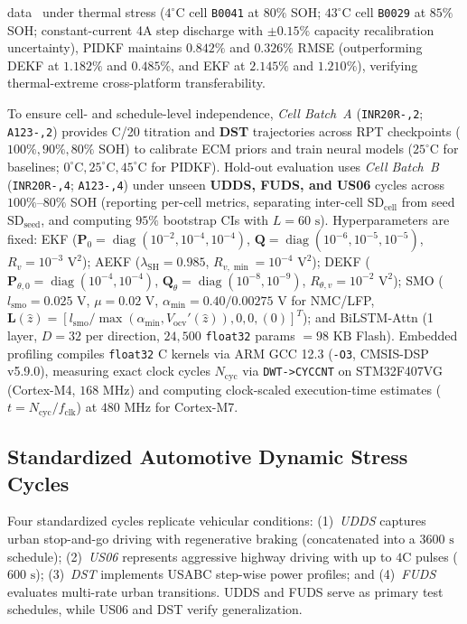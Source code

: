 \documentclass[balance,nocopyright,upint,varvw,hyphenate,barcolor=NavyBlue,nolists]{asmejour}
\begin{document}
data~\cite{Saha2007nasa} under thermal stress ($4^\circ\text{C}$ cell \texttt{B0041} at $80\%$ SOH; $43^\circ\text{C}$ cell \texttt{B0029} at $85\%$ SOH; constant-current 4A step discharge with $\pm 0.15\%$ capacity recalibration uncertainty), PIDKF maintains $0.842\%$ and $0.326\%$ RMSE (outperforming DEKF at $1.182\%$ and $0.485\%$, and EKF at $2.145\%$ and $1.210\%$), verifying thermal-extreme cross-platform transferability.

To ensure cell- and schedule-level independence, \emph{Cell Batch~A} (\texttt{INR20R-,2}; \texttt{A123-,2}) provides C/20 titration and \textbf{DST} trajectories across RPT checkpoints ($100\%, \allowbreak 90\%, \allowbreak 80\%$ SOH) to calibrate ECM priors and train neural models ($25^\circ\text{C}$ for baselines; $0^\circ\text{C}, \allowbreak 25^\circ\text{C}, \allowbreak 45^\circ\text{C}$ for PIDKF). Hold-out evaluation uses \emph{Cell Batch~B} (\texttt{INR20R-,4}; \texttt{A123-,4}) under unseen \textbf{UDDS, FUDS, and US06} cycles across $100\%\text{--}80\%$ SOH (reporting per-cell metrics, separating inter-cell $\text{SD}_{\text{cell}}$ from seed $\text{SD}_{\text{seed}}$, and computing $95\%$ bootstrap CIs with $L=60\text{ s}$). Hyperparameters are fixed: EKF ($\mathbf{P}_0 = \allowbreak\operatorname{diag}(10^{-2}, \allowbreak 10^{-4}, \allowbreak 10^{-4})$, $\mathbf{Q} = \allowbreak\operatorname{diag}(10^{-6}, \allowbreak 10^{-5}, \allowbreak 10^{-5})$, $R_v = \allowbreak 10^{-3}\text{ V}^2$); AEKF ($\lambda_{\text{SH}} = 0.985$, $R_{v,\min} = \allowbreak 10^{-4}\text{ V}^2$); DEKF ($\mathbf{P}_{\theta,0} = \allowbreak\operatorname{diag}(10^{-4}, \allowbreak 10^{-4})$, $\mathbf{Q}_\theta = \allowbreak\operatorname{diag}(10^{-8}, \allowbreak 10^{-9})$, $R_{\theta,v} = \allowbreak 10^{-2}\text{ V}^2$); SMO ($l_{\text{smo}} = 0.025\text{ V}$, $\mu = 0.02\text{ V}$, $\alpha_{\min} = 0.40/0.00275\text{ V}$ for NMC/LFP, $\mathbf{L}(\hat{z}) = [l_{\text{smo}}/\max(\alpha_{\min}, V_{\text{ocv}}'(\hat{z})), 0, 0, (0)]^T$); and BiLSTM-Attn (1 layer, $D=32$ per direction, $24,500$ \texttt{float32} params $= 98\text{ KB}$ Flash). Embedded profiling compiles \texttt{float32} C kernels via ARM GCC 12.3 (\texttt{-O3}, CMSIS-DSP v5.9.0), measuring exact clock cycles $N_{\text{cyc}}$ via \texttt{DWT-}\allowbreak\texttt{>CYCCNT} on STM32F407VG (Cortex-M4, $168\text{ MHz}$) and computing clock-scaled execution-time estimates ($t = \allowbreak N_{\text{cyc}}/f_{\text{clk}}$) at $480\text{ MHz}$ for Cortex-M7.

\subsection{Standardized Automotive Dynamic Stress Cycles}
Four standardized cycles replicate vehicular conditions: (1)~\emph{UDDS} captures urban stop-and-go driving with regenerative braking (concatenated into a $3600\text{ s}$ schedule); (2)~\emph{US06} represents aggressive highway driving with up to $4\text{C}$ pulses ($600\text{ s}$); (3)~\emph{DST} implements USABC step-wise power profiles; and (4)~\emph{FUDS} evaluates multi-rate urban transitions. UDDS and FUDS serve as primary test schedules, while US06 and DST verify generalization.
\end{document}

